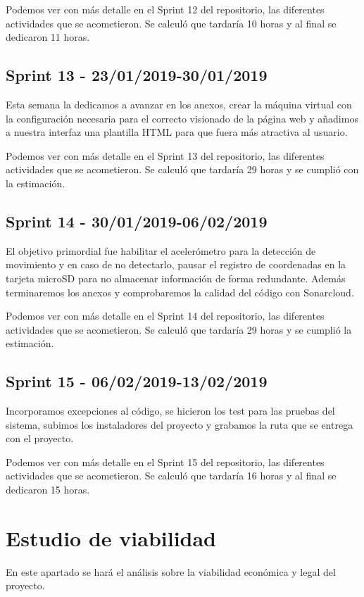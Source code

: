 Podemos ver con más detalle en el Sprint 12 del repositorio, las diferentes actividades que se acometieron. 
Se calculó que tardaría 10 horas y al final se dedicaron 11 horas.

\subsection{Sprint 13 - 23/01/2019-30/01/2019}
Esta semana la dedicamos a avanzar en los anexos, crear la máquina virtual con la configuración necesaria para el correcto visionado de la página web y añadimos a nuestra interfaz una plantilla HTML para que fuera más atractiva al usuario.

Podemos ver con más detalle en el Sprint 13 del repositorio, las diferentes actividades que se acometieron. 
Se calculó que tardaría 29 horas y se cumplió con la estimación.

\subsection{Sprint 14 - 30/01/2019-06/02/2019}
El objetivo primordial fue habilitar el acelerómetro para la detección de movimiento y en caso de no detectarlo, pausar el registro de coordenadas en la tarjeta microSD para no almacenar información de forma redundante. Además terminaremos los anexos y comprobaremos la calidad del código con Sonarcloud.

Podemos ver con más detalle en el Sprint 14 del repositorio, las diferentes actividades que se acometieron. 
Se calculó que tardaría 29 horas y se cumplió la estimación.

\subsection{Sprint 15 - 06/02/2019-13/02/2019}
Incorporamos excepciones al código, se hicieron los test para las pruebas del sistema, subimos los instaladores del proyecto y grabamos la ruta que se entrega con el proyecto.

Podemos ver con más detalle en el Sprint 15 del repositorio, las diferentes actividades que se acometieron. 
Se calculó que tardaría 16 horas y al final se dedicaron 15 horas.

\section{Estudio de viabilidad}
En este apartado se hará el análisis sobre la viabilidad económica y legal del proyecto.

